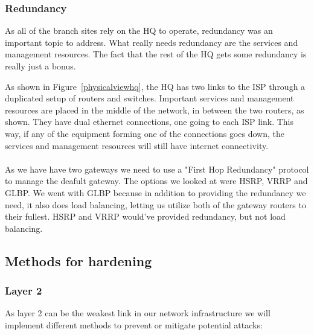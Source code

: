 
\subsubsection{Redundancy}

As all of the branch sites rely on the HQ to operate, redundancy was an important topic to address. What really needs redundancy are the services and management resources. The fact that the rest of the HQ gets some redundancy is really just a bonus.

As shown in Figure~\ref{physicalviewhq}, the HQ has two links to the ISP through a duplicated setup of routers and switches. Important services and management resources are placed in the middle of the network, in between the two routers, as shown. They have dual ethernet connections, one going to each ISP link. This way, if any of the equipment forming one of the connections goes down, the services and management resources will still have internet connectivity.
\\
\\
As we have have two gateways we need to use a "First Hop Redundancy" protocol to manage the deafult gateway. The options we looked at were HSRP, VRRP and GLBP. We went with GLBP because in addition to providing the redundancy we need, it also does load balancing, letting us utilize both of the gateway routers to their fullest. HSRP and VRRP would've provided redundancy, but not load balancing.




\subsection{Methods for hardening}

\subsubsection{Layer 2}
As layer 2 can be the weakest link in our network infrastructure we will implement different methods to prevent or mitigate potential attacks:

